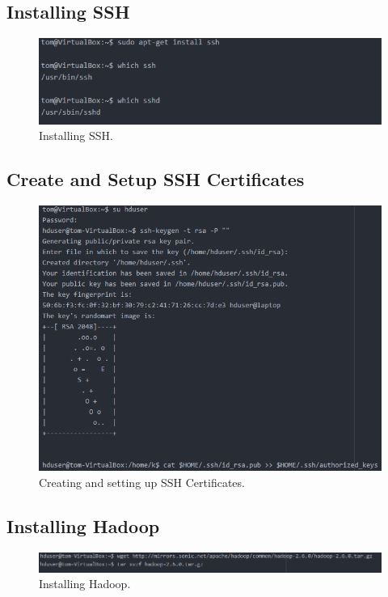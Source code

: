 \documentclass[12pt, letterpaper]{article}
\begin{document}
\subsection{Installing SSH}

\begin{figure}[H]
\centering
\includegraphics[width=12cm]{RH3}
\caption{Installing SSH.}
\label{fig:is}
\end{figure}

\subsection{Create and Setup SSH Certificates}

\begin{figure}[H]
\centering
\includegraphics[width=12cm]{RH4}
\caption{Creating and setting up SSH Certificates.}
\label{fig:ij}
\end{figure}


\subsection{Installing Hadoop}

\begin{figure}[H]
\centering
\includegraphics[width=12cm]{RH5}
\caption{Installing Hadoop.}
\label{fig:ij}
\end{figure}
\end{document}
